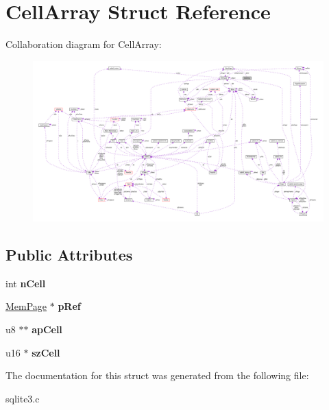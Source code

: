 \hypertarget{structCellArray}{}\section{Cell\+Array Struct Reference}
\label{structCellArray}


Collaboration diagram for Cell\+Array\+:\nopagebreak
\begin{figure}[H]
\begin{center}
\leavevmode
\includegraphics[width=350pt]{structCellArray__coll__graph}
\end{center}
\end{figure}
\subsection*{Public Attributes}
\begin{DoxyCompactItemize}
\item 
int {\bfseries n\+Cell}\hypertarget{structCellArray_a8fe33d4e52945d03ca96b4593995813d}{}\label{structCellArray_a8fe33d4e52945d03ca96b4593995813d}

\item 
\hyperlink{structMemPage}{Mem\+Page} $\ast$ {\bfseries p\+Ref}\hypertarget{structCellArray_a14046c4bbf3090696f4e6909e94fa44d}{}\label{structCellArray_a14046c4bbf3090696f4e6909e94fa44d}

\item 
u8 $\ast$$\ast$ {\bfseries ap\+Cell}\hypertarget{structCellArray_a70f7b19795ffe0c921484857721135a2}{}\label{structCellArray_a70f7b19795ffe0c921484857721135a2}

\item 
u16 $\ast$ {\bfseries sz\+Cell}\hypertarget{structCellArray_a66bb706ff8b01135461c0a9f0b72c47b}{}\label{structCellArray_a66bb706ff8b01135461c0a9f0b72c47b}

\end{DoxyCompactItemize}


The documentation for this struct was generated from the following file\+:\begin{DoxyCompactItemize}
\item 
sqlite3.\+c\end{DoxyCompactItemize}
